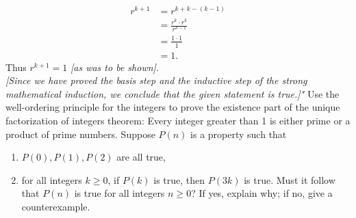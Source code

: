 \documentclass[12pt,letterpaper, onecolumn]{exam}
\begin{document}
\begin{questions}
		\begin{align*}
			r^{k+1}&=r^{k+k-(k-1)}\tag{$k+k-(k-1) = k+k-k+1 = k+1$}\\
			&=\frac{r^k\cdot r^k}{r^{k-1}}\tag{by the laws of exponents}\\
			&=\frac{1\cdot1}{1}\tag{by inductive hypothesis}\\
			&=1.
		\end{align*}
	Thus $r^{k+1}=1$ \textit{[as was to be shown].}\\
	\textit{[Since we have proved the basis step and the inductive step of the strong mathematical induction, we conclude that the given statement is true.]"}
	\setcounter{question}{20} \question Use the well-ordering principle for the integers to prove the existence part of the unique factorization of integers theorem: Every integer greater than 1 is either prime or a product of prime numbers.
	\setcounter{question}{25} \question Suppose $P(n)$ is a property such that
	\begin{enumerate}
	\item $P(0), P(1), P(2)$ are all true,
	\item for all integers $k\geq0$, if $P(k)$ is true, then $P(3k)$ is true. Must it follow that $P(n)$ is true for all integers $n\geq0$? If yes, explain why; if no, give a counterexample.
	\end{enumerate}
	\end{questions}	
	
\end{document}

